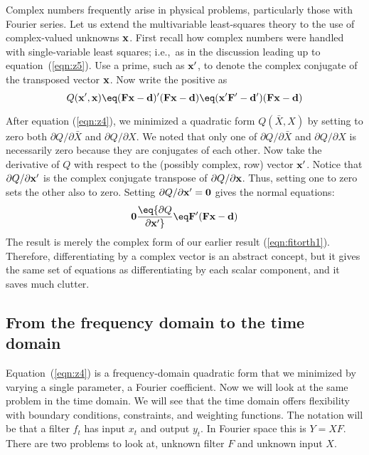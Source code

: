 \par
Complex numbers frequently arise in physical problems,
particularly those with Fourier series.
Let us extend the multivariable least-squares theory
to the use of complex-valued unknowns $\bold x$.
First recall how complex numbers were handled
with single-variable least squares;
i.e.,~as in the discussion leading up to equation~(\ref{eqn:z5}).
Use a prime, such as $\bold x'$, to denote the complex conjugate
of the transposed vector $\bold x$.
Now write the positive  as
\begin{equation}
Q(\bold x', \bold x) \eq
(\bold F\bold x - \bold d)'
(\bold F\bold x - \bold d)
\eq
(\bold x' \bold F' - \bold d')
(\bold F\bold x - \bold d)
\label{eqn:6-1-23}
\end{equation}

After equation (\ref{eqn:z4}),
we minimized a quadratic form $Q(\bar X,X)$
by setting to zero both
$\partial Q/\partial \bar X$ and $\partial Q/\partial X$.
We noted that only one of
$\partial Q/\partial \bar X$ and $\partial Q/\partial X$
is necessarily zero
because they are conjugates of each other.
Now take the derivative of $Q$
with respect to the (possibly complex, row) vector $\bold x'$.
Notice that $\partial Q/\partial  \bold x'$ is the complex conjugate transpose
of $\partial Q/\partial  \bold x$.
Thus, setting one to zero sets the other also to zero.
Setting $\partial Q/\partial \bold x' =\bold 0$ gives the normal equations:
\begin{equation}
\bold 0 \eq {\partial Q \over \partial \bold x'}  \eq
\bold F' (\bold F\bold x - \bold d)
\label{eqn:normeq}
\end{equation}
The result is merely the complex form of
our earlier result (\ref{eqn:fitorth1}).
Therefore,
differentiating by a complex vector
is an abstract concept,
but it gives the same set of equations
as differentiating by each scalar component,
and it saves much clutter.

\subsection{From the frequency domain to the time domain}
Equation~(\ref{eqn:z4}) is a frequency-domain quadratic form
that we minimized by varying a single parameter,
a Fourier coefficient.
Now we will look at the same problem in the time domain.
We will see that the time domain offers flexibility with
boundary conditions, constraints, and weighting functions.
The notation will be that a filter $f_t$ has input $x_t$ and output $y_t$.
In Fourier space this is $Y=XF$.
There are two problems to look at,
unknown filter $F$ and unknown input $X$.

